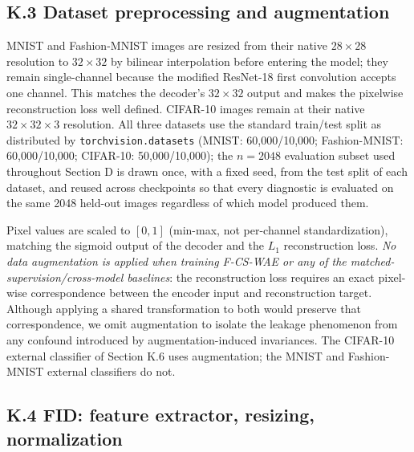 \documentclass[letterpaper]{article} %
\newcommand{\ours}{F-CS-WAE}
\begin{document}
\subsection{K.3 Dataset preprocessing and augmentation}

MNIST and Fashion-MNIST images are resized from their native $28\times28$
resolution to $32\times32$ by bilinear interpolation before entering the
model; they remain single-channel because the modified ResNet-18 first
convolution accepts one channel. This matches the decoder's $32\times32$
output and makes the pixelwise reconstruction loss well defined. CIFAR-10
images remain at their native $32\times32\times3$ resolution. All three
datasets use the standard train/test split as
distributed by \texttt{torchvision.datasets} (MNIST: 60,000/10,000;
Fashion-MNIST: 60,000/10,000; CIFAR-10: 50,000/10,000); the $n{=}2048$
evaluation subset used throughout Section D is drawn once, with a fixed seed,
from the test split of each dataset, and reused across checkpoints so that
every diagnostic is evaluated on the same 2048 held-out images regardless of
which model produced them.

Pixel values are scaled to $[0,1]$ (min-max, not per-channel standardization),
matching the sigmoid output of the decoder and the $L_1$ reconstruction loss.
\emph{No data augmentation is applied when training \ours{} or any of the
matched-supervision/cross-model baselines}: the reconstruction loss requires
an exact pixel-wise correspondence between the encoder input and reconstruction
target. Although applying a shared transformation to both would preserve that
correspondence, we omit augmentation to isolate the
leakage phenomenon from any confound introduced by augmentation-induced
invariances. The CIFAR-10 external classifier of Section K.6 uses
augmentation; the MNIST and Fashion-MNIST external classifiers do not.

\subsection{K.4 FID: feature extractor, resizing, normalization}
\end{document}
